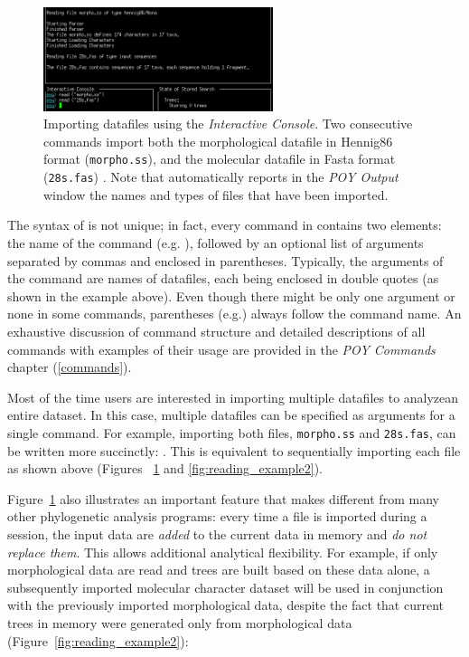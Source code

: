 \begin{figure}
    \begin{center}
        \includegraphics[width=0.6\textwidth]{figures/reading_example.jpg}
    \end{center}
    \caption{Importing datafiles using the \emph{Interactive Console}. Two consecutive  commands import both the morphological datafile in Hennig86 format (\texttt{morpho.ss}), and the molecular datafile in Fasta format (\texttt{28s.fas}) . Note that \poy automatically reports  in the \emph{POY Output} window the names and types of files that have been imported.}
    \label{fig:readingexample}
\end{figure}

The syntax of  is not unique; in fact, every command in \poyv contains two elements: the name of the command (e.g. ), followed by an optional list of arguments 
separated by commas and enclosed in parentheses. Typically, the arguments of the command  are names of datafiles, each being enclosed in double quotes (as shown in the example above). Even though there might be only one argument or none in some commands, parentheses (e.g.) always follow the command name. An exhaustive discussion of \poy command structure and detailed descriptions of all commands with examples of their usage are provided in the \emph{POY Commands} chapter (\ref{commands}).

Most of the time users are interested in importing multiple datafiles to analyzean entire dataset. In this case, multiple datafiles can be specified as arguments for a single command. For example, importing both files, \texttt{morpho.ss} and \texttt{28s.fas}, can be written more succinctly:
. This is equivalent to sequentially importing each file as shown above (Figures ~\ref{fig:readingexample} and \ref{fig:reading_example2}).

Figure~\ref{fig:readingexample} also illustrates an important feature that makes \poy different from many other phylogenetic analysis programs: every time a file is imported during a \poy session, the input data are \emph{added} to the current data in memory and \emph{do not replace them}. This allows additional analytical flexibility. For example, if only morphological data are read and trees are built based on these data alone, a subsequently imported molecular character dataset will be used in conjunction with the previously imported morphological data, despite the fact that current trees in memory were generated only from morphological data (Figure~\ref{fig:reading_example2}):

